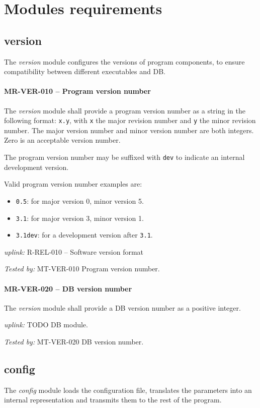 \section{Modules requirements}
\subsection{version}
The \emph{version} module configures the versions of program components,
to ensure compatibility between different executables and \gls{DB}.

\paragraph{MR-VER-010 -- Program version number}
The \emph{version} module shall provide a program version number
as a string in the following format: \lstinline{x.y},
with \lstinline{x} the major revision number and \lstinline{y} the
minor revision number. The major version number and minor version
number are both integers. Zero is an acceptable version number.

The program version number may be suffixed with \lstinline{dev} to
indicate an internal development version.

Valid program version number examples are:
\begin{itemize}
\item \lstinline{0.5}: for major version 0, minor version 5.
\item \lstinline{3.1}: for major version 3, minor version 1.
\item \lstinline{3.1dev}: for a development version after \lstinline{3.1}.
\end{itemize}

\textit{uplink: } R-REL-010 -- Software version format

\textit{Tested by: } MT-VER-010 Program version number.

\paragraph{MR-VER-020 -- DB version number}
The \emph{version} module shall provide a \gls{DB} version number as
a positive integer.

\textit{uplink: } TODO DB module.

\textit{Tested by: } MT-VER-020 DB version number.

\subsection{config}
The \emph{config} module loads the configuration file, translates the parameters
into an internal representation and transmits them to the rest of the program.

